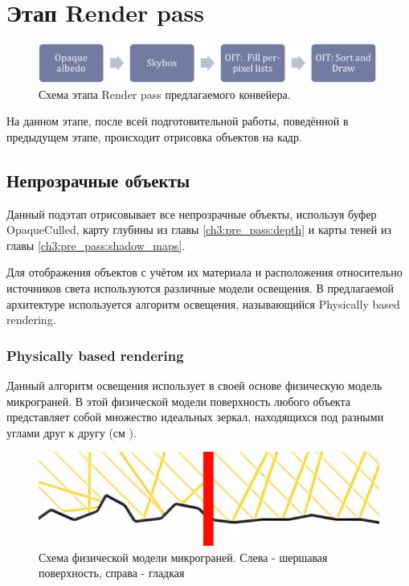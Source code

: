 \section{Этап Render pass} \label{ch3:render_pass}
	\begin{figure}[ht!] 
		\center
		\includegraphics [scale=0.4] {my_folder/images//renderpass_schema}	
		\caption{Схема этапа Render pass предлагаемого конвейера.} 
		\label{fig:renderpass_schema}
	\end{figure}
	
	На данном этапе, после всей подготовительной работы, поведённой в предыдущем этапе, происходит отрисовка объектов на кадр.
	
	\subsection{Непрозрачные объекты} \label{ch3:render_pass:opaque}
		Данный подэтап отрисовывает все непрозрачные объекты, используя буфер OpaqueCulled, карту глубины из главы \ref{ch3:pre_pass:depth} и карты теней из главы \ref{ch3:pre_pass:shadow_maps}.
		
		Для отображения объектов с учётом их материала и расположения относительно источников света используются различные модели освещения. В предлагаемой архитектуре используется алгоритм освещения, называющийся Physically based rendering\cite{pharr2016physically}.
	
		\subsubsection{Physically based rendering} \label{ch3:render_pass:opaque:pbr}
			Данный алгоритм освещения использует в своей основе физическую модель микрограней\cite{walter2007microfacet}. В этой физической модели поверхность любого объекта представляет собой множество идеальных зеркал, находящихся под разными углами друг к другу (см ).
			
			\begin{figure}[ht!] 
				\center
				\includegraphics [scale=0.4] {my_folder/images//microfacet}	
				\caption{Схема физической модели микрограней. Слева - шершавая поверхность, справа - гладкая} 
				\label{fig:microfacet}
			\end{figure}
			
